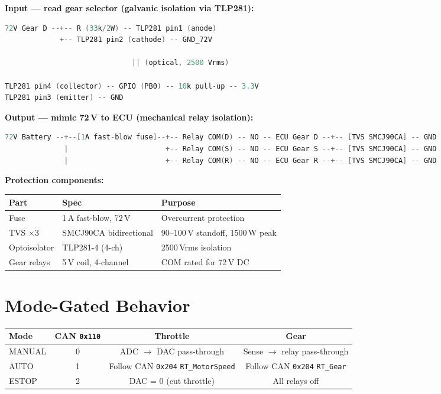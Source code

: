 \documentclass[12pt,a4paper,oneside]{report}
\newcommand{\canid}[1]{\texttt{0x#1}}
\begin{document}
\noindent\textbf{Input --- read gear selector (galvanic isolation via TLP281):}

\begin{lstlisting}[language=C, caption={TLP281 gear sense circuit. 72\,V present = GPIO reads LOW.}]
72V Gear D --+-- R (33k/2W) -- TLP281 pin1 (anode)
             +-- TLP281 pin2 (cathode) -- GND_72V

                              || (optical, 2500 Vrms)

TLP281 pin4 (collector) -- GPIO (PB0) -- 10k pull-up -- 3.3V
TLP281 pin3 (emitter) -- GND
\end{lstlisting}

\noindent\textbf{Output --- mimic 72\,V to ECU (mechanical relay isolation):}

\begin{lstlisting}[language=C, caption={Gear relay output protection. 1A fuse + TVS per channel.}]
72V Battery --+--[1A fast-blow fuse]--+-- Relay COM(D) -- NO -- ECU Gear D --+-- [TVS SMCJ90CA] -- GND
              |                       +-- Relay COM(S) -- NO -- ECU Gear S --+-- [TVS SMCJ90CA] -- GND
              |                       +-- Relay COM(R) -- NO -- ECU Gear R --+-- [TVS SMCJ90CA] -- GND
\end{lstlisting}

\noindent\textbf{Protection components:}

\begin{center}
\begin{tabular}{lll}
\toprule
\textbf{Part} & \textbf{Spec} & \textbf{Purpose} \\
\midrule
Fuse       & 1\,A fast-blow, 72\,V    & Overcurrent protection \\
TVS $\times$3 & SMCJ90CA bidirectional  & 90--100\,V standoff, 1500\,W peak \\
Optoisolator  & TLP281-4 (4-ch)          & 2500\,Vrms isolation \\
Gear relays   & 5\,V coil, 4-channel     & COM rated for 72\,V DC \\
\bottomrule
\end{tabular}
\end{center}

\section{Mode-Gated Behavior}

\begin{center}
\begin{tabular}{lccc}
\toprule
\textbf{Mode} & \textbf{CAN \canid{110}} & \textbf{Throttle} & \textbf{Gear} \\
\midrule
MANUAL & 0 & ADC $\rightarrow$ DAC pass-through & Sense $\rightarrow$ relay pass-through \\
AUTO   & 1 & Follow CAN \canid{204} \texttt{RT\_MotorSpeed} & Follow CAN \canid{204} \texttt{RT\_Gear} \\
ESTOP  & 2 & DAC = 0 (cut throttle) & All relays off \\
\bottomrule
\end{tabular}
\end{center}
\end{document}
